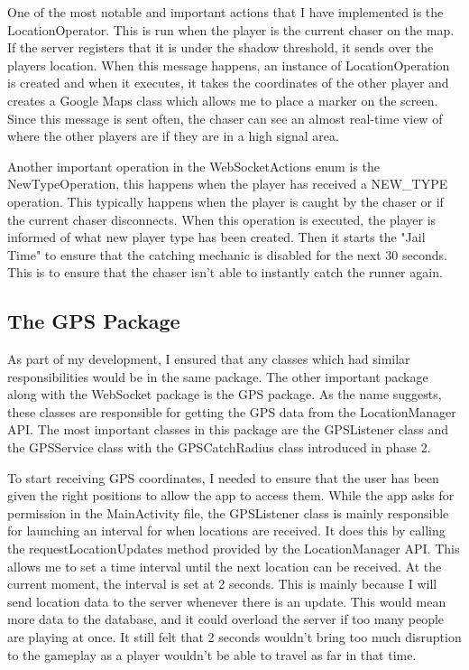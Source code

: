 \documentclass{l4proj}
\begin{document}
One of the most notable and important actions that I have implemented is the LocationOperator. This is run when the player
is the current chaser on the map. If the server registers that it is under the shadow threshold, it sends over the
players location. When this message happens, an instance of LocationOperation is created and when it executes, it
takes the coordinates of the other player and creates a Google Maps class which allows me to place a marker on the
screen. Since this message is sent often, the chaser can see an almost real-time view of where the other players
are if they are in a high signal area.

Another important operation in the WebSocketActions enum is the NewTypeOperation, this happens when the player has received
a NEW\_TYPE operation. This typically happens when the player is caught by the chaser or if the current chaser disconnects.
When this operation is executed, the player is informed of what new player type has been created. Then it starts the "Jail Time" to ensure that the catching mechanic is disabled for the next 30 seconds. This is to ensure that the
chaser isn't able to instantly catch the runner again.



\subsection{The GPS Package}
As part of my development, I ensured that any classes which had similar responsibilities would be in the same
package. The other important package along with the WebSocket package is the GPS package. As the name suggests,
these classes are responsible for getting the GPS data from the LocationManager API. The most important classes
in this package are the GPSListener class and the GPSService class with the GPSCatchRadius class introduced in
phase 2.

To start receiving GPS coordinates, I needed to ensure that the user has been given the right positions to
allow the app to access them. While the app asks for permission in the MainActivity file, the GPSListener class
is mainly responsible for launching an interval for when locations are received. It does this by calling the
requestLocationUpdates method provided by the LocationManager API. This allows me to set a time interval until
the next location can be received. At the current moment, the interval is set at 2 seconds. This is mainly because
I will send location data to the server whenever there is an update. This would mean more data to the database, and
it could overload the server if too many people are playing at once. It still felt that 2 seconds wouldn't bring
too much disruption to the gameplay as a player wouldn't be able to travel as far in that time.
\end{document}
